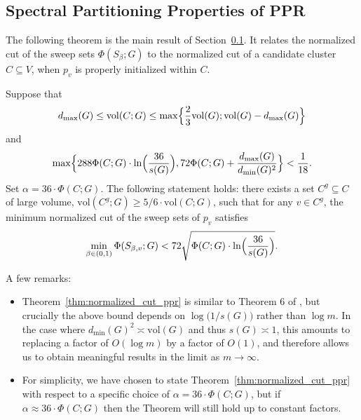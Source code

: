 \documentclass[twoside,11pt]{article}
\newcommand{\1}{\mathbf{1}}
\newcommand{\vol}{\mathrm{vol}}
\begin{document}
\subsection{Spectral Partitioning Properties of PPR}
\label{subsec:ppr_spectral_partitioning}
The following theorem is the main result of Section~\ref{subsec:ppr_spectral_partitioning}. It relates the normalized cut of the sweep sets $\Phi(S_{\beta};G)$ to the normalized cut of a candidate cluster $C \subseteq V$, when $p_v$ is properly initialized within $C$.

\begin{theorem}
	\label{thm:normalized_cut_ppr}
	Suppose that
	\begin{equation}
	\label{eqn:normalized_cut_ppr_vol}
	d_{\max}(G) \leq \vol(C;G) \leq \max\Bigl\{\frac{2}{3}\vol(G); \vol(G) - d_{\max}(G)\Bigr\}
	\end{equation}
	and
	\begin{equation}
	\label{eqn:normalized_cut_ppr_ncut}
	\max\Bigl\{288\Phi(C;G)\cdot \ln\Bigl(\frac{36}{s(G)}\Bigr),72\Phi(C;G) + \frac{d_{\max}(G)}{d_{\min}(G)^2}\Bigr\} < \frac{1}{18}.
	\end{equation}
	Set $\alpha = 36 \cdot \Phi(C;G)$. The following statement holds: there exists a set $C^g \subseteq C$ of large volume, $\vol(C^g;G) \geq 5/6 \cdot \vol(C;G)$, such that for any $v \in C^g$,  the minimum normalized cut of the sweep sets of $p_v$ satisfies 
	\begin{equation}
	\label{eqn:normalized_cut_ppr}
	\min_{\beta \in (0,1)}\Phi(S_{\beta,v};G) < 72\sqrt{\Phi(C;G) \cdot \ln\Bigl(\frac{36}{s(G)}\Bigr)}.
	\end{equation}
\end{theorem}
A few remarks:
\begin{itemize}
	\item Theorem~\ref{thm:normalized_cut_ppr} is similar to Theorem 6 of \citet{andersen2006}, but crucially the above bound depends on $\log\bigl(1/s(G)\bigr)$ rather than $\log m$. In the case where $d_{\min}(G)^2 \asymp \vol(G)$ and thus $s(G) \asymp 1$, this amounts to replacing a factor of $O(\log m)$ by a factor of ${O}(1)$, and therefore allows us to obtain meaningful results in the limit as $m \to \infty$. 
	\item For simplicity, we have chosen to state Theorem~\ref{thm:normalized_cut_ppr} with respect to a specific choice of $\alpha = 36 \cdot \Phi(C;G)$, but if $\alpha \approx 36 \cdot \Phi(C;G)$ then the Theorem will still hold up to constant factors.
\end{itemize}
\end{document}

